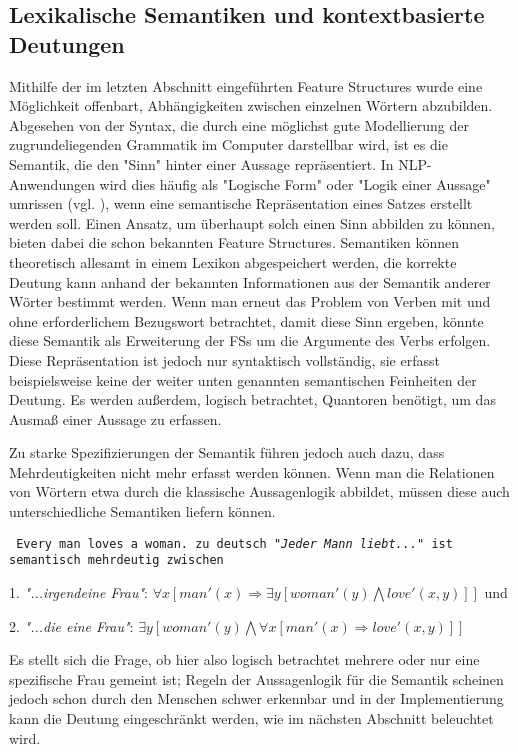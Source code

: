\documentclass[12pt]{paper}
\begin{document}
\subsection{Lexikalische Semantiken und kontextbasierte Deutungen}
Mithilfe der im letzten Abschnitt eingeführten Feature Structures wurde eine Möglichkeit offenbart, Abhängigkeiten zwischen einzelnen Wörtern abzubilden. Abgesehen von der Syntax, die durch eine möglichst gute Modellierung der zugrundeliegenden Grammatik im Computer darstellbar wird, ist es die Semantik, die den "Sinn" hinter einer Aussage repräsentiert. In NLP-Anwendungen wird dies häufig als "Logische Form" oder "Logik einer Aussage" umrissen (vgl. \cite{swb02}), wenn eine semantische Repräsentation eines Satzes erstellt werden soll. Einen Ansatz, um überhaupt solch einen Sinn abbilden zu können, bieten dabei die schon bekannten Feature Structures. Semantiken können theoretisch allesamt in einem Lexikon abgespeichert werden, die korrekte Deutung kann anhand der bekannten Informationen aus der Semantik anderer Wörter bestimmt werden. Wenn man erneut das Problem von Verben mit und ohne erforderlichem Bezugswort betrachtet, damit diese Sinn ergeben, könnte diese Semantik als Erweiterung der FSs um die Argumente des Verbs erfolgen. Diese Repräsentation ist jedoch nur syntaktisch vollständig, sie erfasst beispielsweise keine der weiter unten genannten semantischen Feinheiten der Deutung. Es werden außerdem, logisch betrachtet, Quantoren benötigt, um das Ausmaß einer Aussage zu erfassen.

Zu starke Spezifizierungen der Semantik führen jedoch auch dazu, dass Mehrdeutigkeiten nicht mehr erfasst werden können. Wenn man die Relationen von Wörtern etwa durch die klassische Aussagenlogik abbildet, müssen diese auch unterschiedliche Semantiken liefern können.

\tt
Every man loves a woman.
\rm
zu deutsch \textit{"Jeder Mann liebt..."} ist semantisch mehrdeutig zwischen  

1. \textit{"...irgendeine Frau"}: $\forall x [man'(x) \Rightarrow \exists y [woman'(y) \bigwedge love'(x,y)]]$  und

2. \textit{"...die eine Frau"}: $\exists y [woman'(y) \bigwedge \forall x [man'(x) \Rightarrow love'(x,y)]]$

Es stellt sich die Frage, ob hier also logisch betrachtet mehrere oder nur eine spezifische Frau gemeint ist; Regeln der Aussagenlogik für die Semantik scheinen jedoch schon durch den Menschen schwer erkennbar und in der Implementierung kann die Deutung eingeschränkt werden, wie im nächsten Abschnitt beleuchtet wird.
\end{document}
